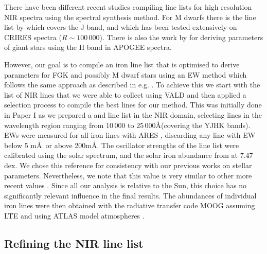 \documentclass[a4paper,fleqn,usenatbib]{mnras}
\begin{document}
There have been different recent studies compiling line lists for high resolution NIR spectra using 
the spectral synthesis method. For M dwarfs there is the line list by \citet{Onehag2012,Lindgren2016} which 
covers the J band, and which has been tested extensively on CRIRES spectra ($R\sim100\,000$). There is also the 
work by \citet{Shetrone2015} for deriving parameters of giant stars using the H band in APOGEE spectra.

However, our goal is to compile an iron line list that is optimised to derive parameters for FGK
and possibly M dwarf stars using an EW method which follows the same approach as described in e.g. \citet{Sousa2008a}.
To achieve this we start with the list of NIR lines that we were able to collect using VALD \citep{VALD1,VALD2} and
then applied a selection process to compile the best lines for our method. This was initially done in Paper I as we 
prepared a  and  line list in the NIR domain, selecting lines in the wavelength region ranging 
from 10\,000 to 25\,000\AA (covering the YJHK bands). EWs were measured for all iron lines with ARES \citep{Sousa2015a}, discarding any line
with EW below 5 m\AA\ or above 200m\AA. The oscillator strengths of the line list were
calibrated using the solar spectrum, and the solar iron abundance from \citet{Gonzalez2000} at 7.47
dex. We chose this reference for consistency with our previous works on stellar parameters.
Nevertheless, we note that this value is very similar to other more recent values
\citep[e.g.][]{Asplund2009}. Since all our analysis is relative to the Sun, this choice has no significantly relevant
influence in the final results. The abundances of individual iron lines were then obtained with the radiative
transfer code MOOG \citep{Sneden1973} assuming LTE and using ATLAS model atmospheres
\citep{Kurucz1993}.


\subsection{Refining the NIR line list}
\label{sec:refining_the_line_list}
\end{document}
